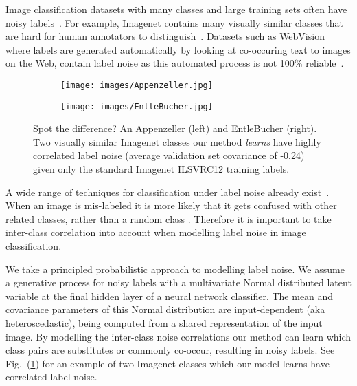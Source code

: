 \documentclass[final]{cvpr}
\begin{document}
Image classification datasets with many classes and large training sets often have noisy labels~\cite{beyer2020we,li2017webvision}. For example, Imagenet contains many visually similar classes that are hard for human annotators to distinguish~\cite{deng2009imagenet,beyer2020we}. Datasets such as WebVision where labels are generated automatically by looking at co-occuring text to images on the Web, contain label noise as this automated process is not 100\% reliable~\cite{li2017webvision}.

\begin{figure}
     \centering
     \begin{subfigure}[b]{0.18\textwidth}
         \centering
         \texttt{[image: images/Appenzeller.jpg]}
     \end{subfigure}
     \begin{subfigure}[b]{0.168\textwidth}
         \centering
         \texttt{[image: images/EntleBucher.jpg]}
     \end{subfigure}
        \caption{Spot the difference? An Appenzeller (left) and EntleBucher (right). Two visually similar Imagenet classes our method \textit{learns} have highly correlated label noise (average validation set covariance of -0.24) given only the standard Imagenet ILSVRC12 training labels.}
        \label{fig:doggos}
\end{figure}

A wide range of techniques for classification under label noise already exist~\cite{lee2018cleannet,MentorNet.2018,guo2018curriculumnet,saxena2019data,jiang2020beyond,cao2020heteroskedastic,collier2020analysis,reed6596training,CoTeaching.2018}. 
When an image is mis-labeled it is more likely that it gets confused with other related classes, rather than a random class \cite{beyer2020we}. Therefore it is important to take inter-class correlation into account when modelling label noise in image classification.

We take a principled probabilistic approach to modelling label noise. We assume a generative process for noisy labels with a multivariate Normal distributed latent variable at the final hidden layer of a neural network classifier. The mean and covariance parameters of this Normal distribution are input-dependent (aka heteroscedastic), being computed from a shared representation of the input image. By modelling the inter-class noise correlations our method can learn which class pairs are substitutes or commonly co-occur, resulting in noisy labels. See Fig.\ (\ref{fig:doggos}) for an example of two Imagenet classes which our model learns have correlated label noise.
\end{document}

